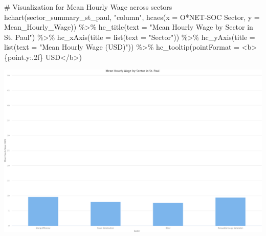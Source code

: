 \documentclass[
  letterpaper,
  DIV=11,
  numbers=noendperiod]{scrartcl}
\newenvironment{Shaded}{\begin{snugshade}}{\end{snugshade}}
\newcommand{\AttributeTok}[1]{\textcolor[rgb]{0.40,0.45,0.13}{#1}}
\newcommand{\CommentTok}[1]{\textcolor[rgb]{0.37,0.37,0.37}{#1}}
\newcommand{\FunctionTok}[1]{\textcolor[rgb]{0.28,0.35,0.67}{#1}}
\newcommand{\NormalTok}[1]{\textcolor[rgb]{0.00,0.23,0.31}{#1}}
\newcommand{\SpecialCharTok}[1]{\textcolor[rgb]{0.37,0.37,0.37}{#1}}
\newcommand{\StringTok}[1]{\textcolor[rgb]{0.13,0.47,0.30}{#1}}
\begin{document}
\begin{Shaded}
\begin{Highlighting}[]
\CommentTok{\# Visualization for Mean Hourly Wage across sectors}
\FunctionTok{hchart}\NormalTok{(sector\_summary\_st\_paul, }\StringTok{"column"}\NormalTok{, }\FunctionTok{hcaes}\NormalTok{(}\AttributeTok{x =} \StringTok{\textasciigrave{}}\AttributeTok{O*NET{-}SOC Sector}\StringTok{\textasciigrave{}}\NormalTok{, }\AttributeTok{y =}\NormalTok{ Mean\_Hourly\_Wage)) }\SpecialCharTok{\%\textgreater{}\%}
  \FunctionTok{hc\_title}\NormalTok{(}\AttributeTok{text =} \StringTok{"Mean Hourly Wage by Sector in St. Paul"}\NormalTok{) }\SpecialCharTok{\%\textgreater{}\%}
  \FunctionTok{hc\_xAxis}\NormalTok{(}\AttributeTok{title =} \FunctionTok{list}\NormalTok{(}\AttributeTok{text =} \StringTok{"Sector"}\NormalTok{)) }\SpecialCharTok{\%\textgreater{}\%}
  \FunctionTok{hc\_yAxis}\NormalTok{(}\AttributeTok{title =} \FunctionTok{list}\NormalTok{(}\AttributeTok{text =} \StringTok{"Mean Hourly Wage (USD)"}\NormalTok{)) }\SpecialCharTok{\%\textgreater{}\%}
  \FunctionTok{hc\_tooltip}\NormalTok{(}\AttributeTok{pointFormat =} \StringTok{\textquotesingle{}\textless{}b\textgreater{}\{point.y:.2f\} USD\textless{}/b\textgreater{}\textquotesingle{}}\NormalTok{)}
\end{Highlighting}
\end{Shaded}

\includegraphics{index_files/figure-pdf/unnamed-chunk-36-2.pdf}
\end{document}
